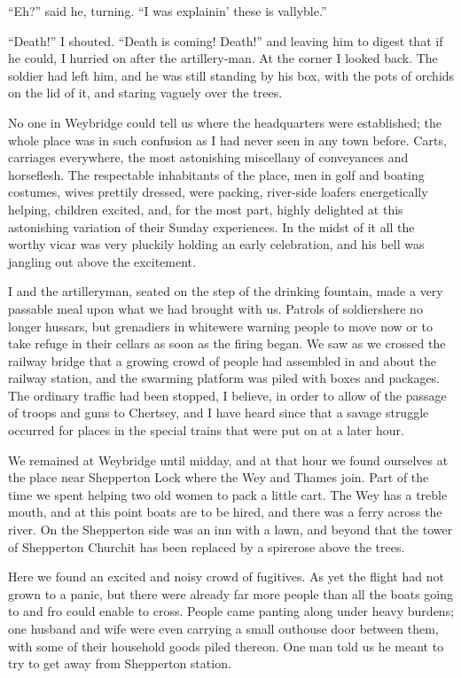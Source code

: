 ``Eh?'' said he, turning. ``I was explainin' these is vallyble.''

``Death!'' I shouted. ``Death is coming! Death!'' and leaving him to
digest that if he could, I hurried on after the artillery-man. At
the corner I looked back. The soldier had left him, and he was
still standing by his box, with the pots of orchids on the lid of
it, and staring vaguely over the trees.

No one in Weybridge could tell us where the headquarters were
established; the whole place was in such confusion as I had never
seen in any town before. Carts, carriages everywhere, the most
astonishing miscellany of conveyances and horseflesh. The
respectable inhabitants of the place, men in golf and boating
costumes, wives prettily dressed, were packing, river-side loafers
energetically helping, children excited, and, for the most part,
highly delighted at this astonishing variation of their Sunday
experiences. In the midst of it all the worthy vicar was very
pluckily holding an early celebration, and his bell was jangling
out above the excitement.

I and the artilleryman, seated on the step of the drinking
fountain, made a very passable meal upon what we had brought with
us. Patrols of soldiers\dash{}here no longer hussars, but grenadiers in
white\dash{}were warning people to move now or to take refuge in their
cellars as soon as the firing began. We saw as we crossed the
railway bridge that a growing crowd of people had assembled in and
about the railway station, and the swarming platform was piled with
boxes and packages. The ordinary traffic had been stopped, I
believe, in order to allow of the passage of troops and guns to
Chertsey, and I have heard since that a savage struggle occurred
for places in the special trains that were put on at a later hour.

We remained at Weybridge until midday, and at that hour we found
ourselves at the place near Shepperton Lock where the Wey and
Thames join. Part of the time we spent helping two old women to
pack a little cart. The Wey has a treble mouth, and at this point
boats are to be hired, and there was a ferry across the river. On
the Shepperton side was an inn with a lawn, and beyond that the
tower of Shepperton Church\dash{}it has been replaced by a spire\dash{}rose
above the trees.

Here we found an excited and noisy crowd of fugitives. As yet the
flight had not grown to a panic, but there were already far more
people than all the boats going to and fro could enable to cross.
People came panting along under heavy burdens; one husband and wife
were even carrying a small outhouse door between them, with some of
their household goods piled thereon. One man told us he meant to
try to get away from Shepperton station.

